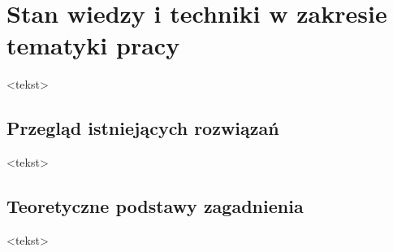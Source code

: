 \chapter{Stan wiedzy i techniki w zakresie tematyki pracy}

<tekst>


\section{Przegląd istniejących rozwiązań}

<tekst>


\section{Teoretyczne podstawy zagadnienia}

<tekst>
